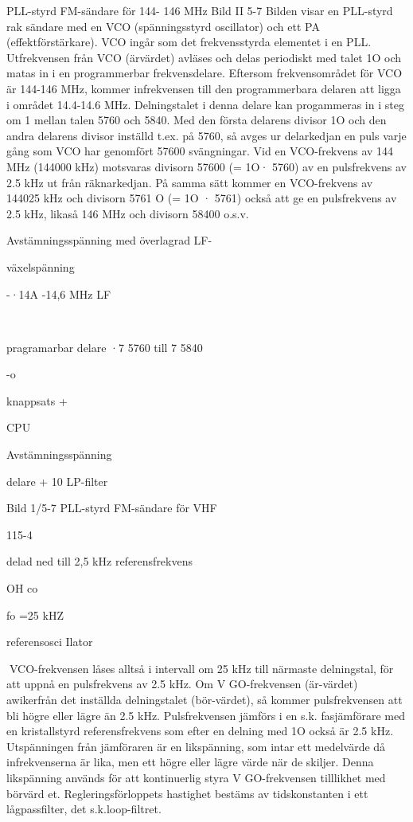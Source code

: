 \documentclass[a4paper,twoside,twocolumn,openright]{book}
\begin{document}
{{{PLL-styrd FM-sändare för 144- 146 MHz
Bild II 5-7
Bilden visar en PLL-styrd rak sändare med
en VCO (spänningsstyrd oscillator) och ett
PA (effektförstärkare).
VCO ingår som det frekvensstyrda elementet i en PLL. Utfrekvensen från VCO (ärvärdet) avläses och delas periodiskt med
talet 1O och matas in i en programmerbar
frekvensdelare. Eftersom frekvensområdet
för VCO är 144-146 MHz, kommer infrekvensen till den programmerbara delaren att
ligga i området 14.4-14.6 MHz. Delningstalet i denna delare kan progammeras in i steg
om 1 mellan talen 5760 och 5840.
Med den första delarens divisor 1O och
den andra delarens divisor inställd t.ex. på
5760, så avges ur delarkedjan en puls varje
gång som VCO har genomfört 57600 svängningar. Vid en VCO-frekvens av 144 MHz
(144000 kHz) motsvaras divisorn 57600 (=
1O· 5760) av en pulsfrekvens av 2.5 kHz ut
från räknarkedjan. På samma sätt kommer
en VCO-frekvens av 144025 kHz och divisorn 5761 O (= 1O · 5761) också att ge en
pulsfrekvens av 2.5 kHz, likaså 146 MHz
och divisorn 58400 o.s.v.

Avstämningsspänning
med överlagrad LF-

växelspänning

-·14A -14,6 MHz
LF

~

pragramarbar delare
·7 5760 till 7 5840

-o

knappsats
+

CPU

Avstämningsspänning

delare + 10
LP-filter

Bild 1/5-7 PLL-styrd FM-sändare för VHF

115-4

delad ned till 2,5 kHz
referensfrekvens

OH
co

fo =25 kHZ

referensosci Ilator

VCO-frekvensen låses alltså i intervall
om 25 kHz till närmaste delningstal, för att
uppnå en pulsfrekvens av 2.5 kHz. Om
V GO-frekvensen (är-värdet) awikerfrån det
inställda delningstalet (bör-värdet), så kommer pulsfrekvensen att bli högre eller lägre
än 2.5 kHz.
Pulsfrekvensen jämförs i en s.k. fasjämförare med en kristallstyrd referensfrekvens
som efter en delning med 1O också är 2.5
kHz. Utspänningen från jämföraren är en
likspänning, som intar ett medelvärde då
infrekvenserna är lika, men ett högre eller
lägre värde när de skiljer. Denna likspänning
används för att kontinuerlig styra V GO-frekvensen tilllikhet med börvärd et. Regleringsförloppets hastighet bestäms av tidskonstanten i ett lågpassfilter, det s.k.loop-filtret.

}}}
\end{document}
